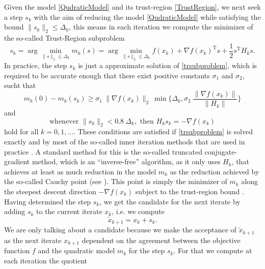Given the model \cref{QudraticModel} and its trust-region \cref{TrustRegion}, we next seek a step $s_k$ with the aim of reducing the model \cref{QudraticModel} while satisfying the bound $\lVert s_k \rVert_2 \leq \Delta_k$, this means in each iteration we compute the minimizer of the so-called Trust-Region subproblem
\begin{equation}\label{trsubproblem}
    s_k = \arg \min_{\lVert s \rVert_2 \leq \Delta_k} m_k(s) = \arg \min_{\lVert s \rVert_2 \leq \Delta_k} f(x_k) + \nabla f(x_k)^{\mathrm{T}} s + \frac{1}{2} s^{\mathrm{T}} H_k s.
\end{equation}
In practice, the step $s_k$ is just a approximate solution of \cref{trsubproblem}, which is required to be accurate enough that there exist positive constants $\sigma_1$ and $\sigma_2$, sucht that 
\begin{equation}\label{accuracy1}
    m_k(0) - m_k(s_k) \geq \sigma_1 \ \lVert \nabla f(x_k) \rVert_2 \ \min \{ \Delta_k, \sigma_2 \ \frac{\lVert \nabla f(x_k) \rVert}{\lVert H_k \rVert} \} 
\end{equation} 
and
\begin{equation}\label{accuracy2}
    \text{whenever } \lVert s_k \rVert_2 < 0.8 \ \Delta_k, \text{ then } H_k s_k = - \nabla f(x_k)
\end{equation}
hold for all $k = 0, 1, \ldots$. These conditions are satisfied if \cref{trsubproblem} is solved exactly and by most of the so-called inner iteration methods that are used in practice \cite[p.~1027]{ByrdKhalfanSchnabel:1996}. A standard method for this is the so-called truncated conjugate-gradient method, which is an “inverse-free” algorithm, as it only uses $H_k$, that achieves at least as much reduction in the model $m_k$ as the reduction achieved by the so-called Cauchy point (see \cite[4.1~Algorithms~based~on~the~cauchy~point]{NocedalWright:2006}). This point is simply the minimizer of $m_k$ along the steepest descent direction $- \nabla f(x_k)$ subject to the trust-region bound \cite[p.~71]{NocedalWright:2006}. \\
Having determined the step $s_k$, we get the candidate for the next iterate by adding $s_k$ to the current iterate $x_k$, i.e. we compute 
\begin{equation}\label{candidate}
    \widetilde{x}_{k+1} = x_k + s_k.
\end{equation}
We are only talking about a candidate because we make the acceptance of $\widetilde{x}_{k+1}$ as the next iterate $x_{k+1}$ dependent on the agreement between the objective function $f$ and the quadratic model $m_k$ for the step $s_k$. For that we compute at each iteration the quotient
